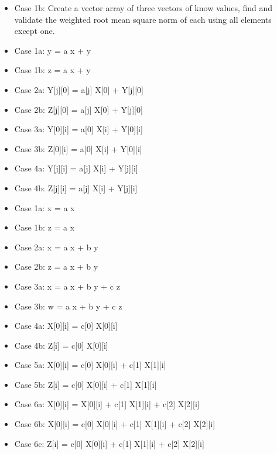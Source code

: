 \begin{itemize}
\item {} Case 1b: Create a vector array of three vectors of know values, find and validate the weighted root mean square norm of each using all elements except one.
\item {} Case 1a: y = a x + y 
\item {} Case 1b: z = a x + y
\item {} Case 2a: Y[j][0] = a[j] X[0] + Y[j][0]
\item {} Case 2b: Z[j][0] = a[j] X[0] + Y[j][0]
\item {} Case 3a: Y[0][i] = a[0] X[i] + Y[0][i]
\item {} Case 3b: Z[0][i] = a[0] X[i] + Y[0][i]
\item {} Case 4a: Y[j][i] = a[j] X[i] + Y[j][i]
\item {} Case 4b: Z[j][i] = a[j] X[i] + Y[j][i]  
\item {} Case 1a: x = a x
\item {} Case 1b: z = a x
\item {} Case 2a: x = a x + b y 
\item {} Case 2b: z = a x + b y
\item {} Case 3a: x = a x + b y + c z
\item {} Case 3b: w = a x + b y + c z
\item {} Case 4a: X[0][i] = c[0] X[0][i]
\item {} Case 4b: Z[i] = c[0] X[0][i]
\item {} Case 5a: X[0][i] = c[0] X[0][i] + c[1] X[1][i]
\item {} Case 5b: Z[i] = c[0] X[0][i] + c[1] X[1][i]
\item {} Case 6a: X[0][i] = X[0][i] + c[1] X[1][i] + c[2] X[2][i]
\item {} Case 6b: X[0][i] = c[0] X[0][i] + c[1] X[1][i] + c[2] X[2][i]
\item {} Case 6c: Z[i] = c[0] X[0][i] + c[1] X[1][i] + c[2] X[2][i]
\end{itemize}
